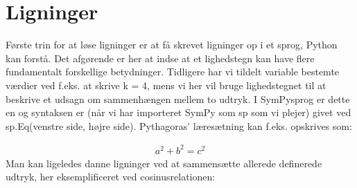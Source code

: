 \documentclass[letterpaper,10pt,english]{jupyterBook}
\begin{document}
\section{Ligninger}
\label{\detokenize{notebooks/sympy/Notebook3_ligninger:ligninger}}\label{\detokenize{notebooks/sympy/Notebook3_ligninger::doc}}
Første trin for at løse ligninger er at få skrevet ligninger op i et sprog, Python kan forstå. Det afgørende er her at indse at et lighedstegn kan have flere fundamentalt forskellige betydninger. Tidligere har vi tildelt variable bestemte værdier ved f.eks. at skrive k = 4, mens vi her vil bruge lighedstegnet til at beskrive et udsagn om sammenhængen mellem to udtryk. I SymPy\sphinxhyphen{}sprog er dette en  og syntaksen er (når vi har importeret SymPy som sp som vi plejer) givet ved sp.Eq(venstre side, højre side). Pythagoras’ læresætning kan f.eks. opskrives som:

\begin{sphinxVerbatim}[commandchars=\\\{\}]
   
                  

               
\end{sphinxVerbatim}
\begin{equation*}
\begin{split}\displaystyle a^{2} + b^{2} = c^{2}\end{split}
\end{equation*}
Man kan ligeledes danne ligninger ved at sammensætte allerede definerede udtryk, her eksemplificeret ved cosinusrelationen:
\end{document}
